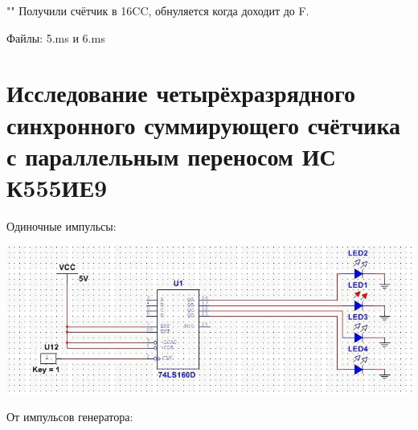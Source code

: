 \documentclass[a4paper,12pt]{article}
\begin{document}
""\newline\newline
\noindent Получили счётчик в 16CC, обнуляется когда доходит до F.\newline

\noindent Файлы: 5.ms и 6.ms\newline

\section{Исследование четырёхразрядного синхронного суммирующего счётчика с параллельным переносом ИС К555ИЕ9}

Одиночные импульсы:
\begin{center}
	\includegraphics[scale=0.75]{../screens/6.jpg}
\end{center}

От импульсов генератора:
\end{document}
